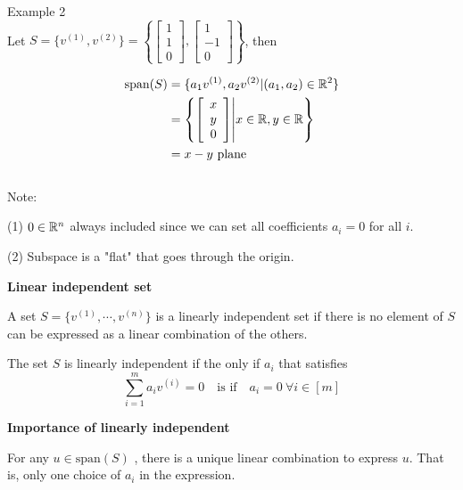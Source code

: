 Example 2\\
Let $S=\{v^{(1)}, v^{(2)}\}=\left\{\left[ 
\begin{array}{c} 
1\\
1\\
0
\end{array}
\right],           
\left[ 
\begin{array}{c} 
1\\
-1\\
0
\end{array}
\right]
\right\}$, then

\begin{align*}
\text{span}(S)&=\{a_{1}v^{(1)}, a_{2}v^{(2)}|(a_{1}, a_{2})\in \mathbb{R}^{2}\}\\
&=\left\{\left[ 
	\begin{array}{c} 
	x\\
	y\\
	0
	\end{array}
	\right] \middle|x\in\mathbb{R} , y\in\mathbb{R}\right\}\\
&=\text{$x-y$ plane}
\end{align*}\\


Note:

(1) $0\in\mathbb{R}^{n}$ always included since we can set all coefficients $a_{i}=0$ for all $i$.

(2) Subspace is a "flat" that goes through the origin.

\vspace{0.5cm}
\noindent\textbf{Linear independent set}

A set $S=\{v^{(1)},\cdots , v^{(n)}\}$ is a linearly independent set if there is no element of $S$ can be expressed as a linear combination of the others.

The set $S$ is linearly independent if the only if $a_{i}$ that satisfies
$$\sum_{i=1}^{m}a_{i}v^{(i)}=0\quad \text{is if} \quad a_{i}=0 \ \forall i\in [m]$$


\vspace{0.5cm}
\textbf{Importance of linearly independent}

For any $u\in \text{span}(S)$ , there is a unique linear combination to express $u$. That is, only one choice of $a_{i}$ in the expression.

\begin{marginfigure}
	\centering
	\resizebox{7.5cm}{3cm}{}
	\caption{}
	\label{fig.2-4}
\end{marginfigure}
\begin{marginfigure}
	\centering
	\resizebox{7.5cm}{3cm}{}
	\caption{}
	\label{fig.2-4}
\end{marginfigure}


